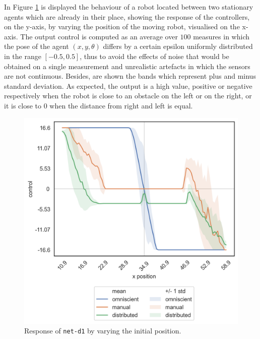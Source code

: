 In Figure \ref{fig:net-d1responseposition} is displayed the behaviour of a robot 
located between two stationary agents which are already in their place, showing 
the response of the controllers, on the y-axis, by varying the position of the 
moving robot, visualised on the x-axis. The output control is computed as an 
average over $100$ measures in which the pose of the agent $(x, y, \theta)$ 
differs by a certain epsilon uniformly distributed in the range $[-0.5, 0.5]$, thus 
to avoid the effects of noise that would be obtained on a single measurement and 
unrealistic artefacts in which the sensors are not continuous. Besides, are shown 
the bands which represent plus and minus standard deviation. As expected, the 
output is a high value, positive or negative respectively when the robot is close to 
an obstacle on the left or on the right, or it is close to $0$ when the distance from 
right and left is equal.
\begin{figure}[!htb]
	\centering
	\includegraphics[width=.45\textwidth]{contents/images/net-d1/response-varying_init_position-distributed}%
	\caption{Response of \texttt{net-d1} by varying the initial position.}
	\label{fig:net-d1responseposition}
\end{figure}


